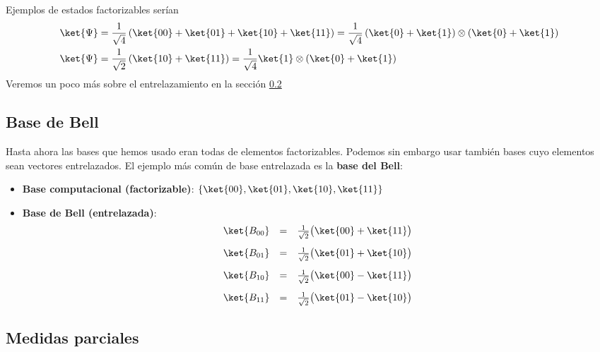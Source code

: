 \documentclass[a4paper,11pt]{book} %
\numberwithin{equation}{chapter}
\def\lp{\left(}
\def\rp{\right)}
\begin{document}
Ejemplos de estados factorizables serían
\begin{align*}
\ket{ \Psi} & = \frac{1}{\sqrt{4}} \lp \ket{00} + \ket{01} + \ket{10} + \ket{11} \rp = 
\frac{1}{\sqrt{4}} \lp \ket{0} + \ket{1} \rp \otimes \lp \ket{0} + \ket{1} \rp \\
\ket{ \Psi} & = \frac{1}{\sqrt{2}} \lp  \ket{10} + \ket{11} \rp = 
\frac{1}{\sqrt{4}}  \ket{1}  \otimes \lp \ket{0} + \ket{1} \rp \\
\end{align*}
Veremos un poco más sobre el entrelazamiento en la sección \ref{sec_subsub_multiqubit_medidas_parciales}






    	\subsection{Base de Bell}

Hasta ahora las bases que hemos usado eran todas de elementos factorizables. Podemos sin embargo usar también bases cuyo elementos sean vectores entrelazados. El ejemplo más común de base entrelazada es la \textbf{base del Bell}:
\begin{itemize}
	\item \textbf{Base computacional (factorizable)}: $\{ \ket{00},\ket{01},\ket{10},\ket{11} \}$
	\item \textbf{Base de Bell (entrelazada)}: 
	\begin{equation} \label{ec_multiqubit_Bell_states}
	\begin{array}{rcl}
	\ket{B_{00}} &=& \frac{1}{\sqrt{2}} \big( \ket{00} + \ket{11} \big) \vspace{3mm} \\ 
	\ket{B_{01}} &=& \frac{1}{\sqrt{2}} \big( \ket{01} + \ket{10} \big) \vspace{3mm} \\ 
	\ket{B_{10}} &=& \frac{1}{\sqrt{2}} \big( \ket{00} - \ket{11} \big) \vspace{3mm} \\ 
	\ket{B_{11}} &=& \frac{1}{\sqrt{2}} \big( \ket{01} - \ket{10} \big) \\
	\end{array}
	\end{equation}
\end{itemize}

        \subsection{Medidas parciales} \label{sec_subsub_multiqubit_medidas_parciales}
\end{document}
